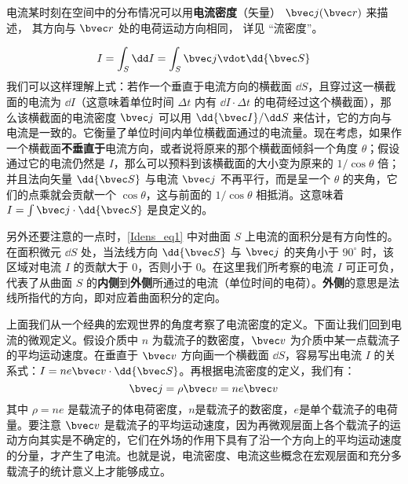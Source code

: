 

电流某时刻在空间中的分布情况可以用\textbf{电流密度}（矢量） $\bvec j(\bvec r)$ 来描述， 其方向与 $\bvec r$ 处的电荷运动方向相同， 详见 “流密度”。

\begin{equation}\label{Idens_eq1}
I = \int_S \dd I= \int_S \bvec j \vdot \dd{\bvec S}
\end{equation}
我们可以这样理解上式：若作一个垂直于电流方向的横截面 $\dd S$，且穿过这一横截面的电流为 $\dd I$（这意味着单位时间 $\Delta t$ 内有 $\dd I\cdot \Delta t$ 的电荷经过这个横截面），那么该横截面的电流密度 $\bvec j$ 可以用 $\dd{\bvec I}/\dd S$ 来估计，它的方向与电流是一致的。它衡量了单位时间内单位横截面通过的电流量。现在考虑，如果作一个横截面\textbf{不垂直于}电流方向，或者说将原来的那个横截面倾斜一个角度 $\theta$；假设通过它的电流仍然是 $I$，那么可以预料到该横截面的大小变为原来的 $1/\cos\theta$ 倍；并且法向矢量 $\dd{\bvec S}$ 与电流 $\bvec j$ 不再平行，而是呈一个 $\theta$ 的夹角，它们的点乘就会贡献一个 $\cos\theta$，这与前面的 $1/\cos\theta$ 相抵消。这意味着 $I=\int \bvec j\cdot \dd{\bvec S}$ 是良定义的。

另外还要注意的一点时，\autoref{Idens_eq1} 中对曲面 $S$ 上电流的面积分是有方向性的。在面积微元 $\dd S$ 处，当法线方向 $\dd{\bvec S}$ 与 $\bvec j$ 的夹角小于 $90^\circ$ 时，该区域对电流 $I$ 的贡献大于 $0$，否则小于 $0$。在这里我们所考察的电流 $I$ 可正可负，代表了从曲面 $S$ 的\textbf{内侧}到\textbf{外侧}所通过的电流（单位时间的电荷）。\textbf{外侧}的意思是法线所指代的方向，即对应着曲面积分的定向。

上面我们从一个经典的宏观世界的角度考察了电流密度的定义。下面让我们回到电流的微观定义。假设介质中 $n$ 为载流子的数密度，$\bvec v$ 为介质中某一点载流子的平均运动速度。在垂直于 $\bvec v$ 方向画一个横截面 $\dd S$，容易写出电流 $I$ 的关系式：$I=ne\bvec v \cdot \dd{\bvec S}$。再根据电流密度的定义，我们有：
\begin{equation}
\bvec j = \rho \bvec v = ne \bvec v
\end{equation}
其中 $\rho=ne$ 是载流子的体电荷密度，$n$是载流子的数密度，$e$是单个载流子的电荷量。要注意 $\bvec v$ 是载流子的平均运动速度，因为再微观层面上各个载流子的运动方向其实是不确定的，它们在外场的作用下具有了沿一个方向上的平均运动速度的分量，才产生了电流。也就是说，电流密度、电流这些概念在宏观层面和充分多载流子的统计意义上才能够成立\cite{GriffE}。
